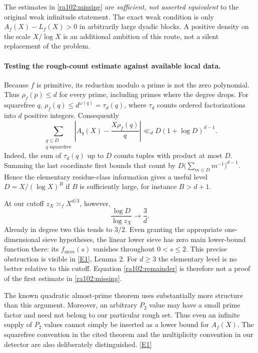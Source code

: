 \documentclass[11pt]{article}
\newcommand{\eref}[2]{\hyperlink{extra:#1:#2}{[E#2]}}
\begin{document}
The estimates in \eqref{ra102:missing} are \emph{sufficient, not asserted
equivalent} to the original weak infinitude statement. The exact weak
condition is only $A_f(X)-L_f(X)>0$ in arbitrarily large dyadic blocks.
A positive density on the scale $X/\log X$ is an additional ambition of this
route, not a silent replacement of the problem.

\paragraph{Testing the rough-count estimate against available local data.}
Because $f$ is primitive, its reduction modulo a prime is not the zero
polynomial. Thus $\rho_f(p)\le d$ for every prime, including primes where
the degree drops. For squarefree $q$,
$\rho_f(q)\le d^{\omega(q)}=\tau_d(q)$, where $\tau_d$ counts ordered
factorizations into $d$ positive integers. Consequently
\begin{equation}\label{ra102:remainder}
 \sum_{\substack{q\le D\\q\text{ squarefree}}}
 \left|A_q(X)-\frac{X\rho_f(q)}q\right|
 \ll_d D(1+\log D)^{d-1}.
\end{equation}
Indeed, the sum of $\tau_d(q)$ up to $D$ counts tuples with product at most
$D$. Summing the last coordinate first bounds that count by
$D\bigl(\sum_{m\le D}m^{-1}\bigr)^{d-1}$.
Hence the elementary residue-class information gives a useful level
$D=X/(\log X)^B$ if $B$ is sufficiently large, for instance $B>d+1$.

At our cutoff $z_X\asymp_f X^{d/3}$, however,
\[
 \frac{\log D}{\log z_X}\longrightarrow\frac3d.
\]
Already in degree two this tends to $3/2$. Even granting the appropriate
one-dimensional sieve hypotheses, the linear lower sieve has zero main
lower-bound function there: its $f_{\mathrm{sieve}}(s)$ vanishes throughout
$0<s\le2$. This precise obstruction is visible in \eref{102}{1}, Lemma 2.
For $d\ge3$ the elementary level is no better relative to this cutoff.
Equation \eqref{ra102:remainder} is therefore not a proof of the first
estimate in \eqref{ra102:missing}.

The known quadratic almost-prime theorem uses substantially more structure
than this argument. Moreover, an arbitrary $P_2$ value may have a small
prime factor and need not belong to our particular rough set. Thus even an
infinite supply of $P_2$ values cannot simply be inserted as a lower bound
for $A_f(X)$. The squarefree convention in the cited theorem and the
multiplicity convention in our detector are also deliberately distinguished.
\eref{102}{1}
\end{document}
